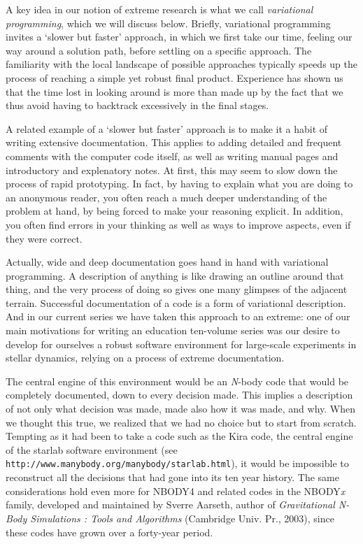 A key idea in our notion of extreme research is what we call {\it
variational programming}, which we will discuss below.  Briefly,
variational programming invites a `slower but faster' approach, in
which we first take our time, feeling our way around a solution path,
before settling on a specific approach.  The familiarity with the
local landscape of possible approaches typically speeds up the process
of reaching a simple yet robust final product.  Experience has shown
us that the time lost in looking around is more than made up by the
fact that we thus avoid having to backtrack excessively in the final
stages.

A related example of a `slower but faster' approach is to make it a
habit of writing extensive documentation.  This applies to adding
detailed and frequent comments with the computer code itself, as well
as writing manual pages and introductory and explenatory notes.  At
first, this may seem to slow down the process of rapid prototyping.
In fact, by having to explain what you are doing to an anonymous
reader, you often reach a much deeper understanding of the problem at
hand, by being forced to make your reasoning explicit.  In addition,
you often find errors in your thinking as well as ways to improve
aspects, even if they were correct.

Actually, wide and deep documentation goes hand in hand with variational
programming.  A description of anything is like drawing an outline around
that thing, and the very process of doing so gives one many glimpses
of the adjacent terrain.  Successful documentation of a code is a form
of variational description.  And in our current series we have taken
this approach to an extreme: one of our main motivations for writing
an education ten-volume series was our desire to develop for ourselves
a robust software environment for large-scale experiments in stellar
dynamics, relying on a process of extreme documentation.

The central engine of this environment would be an {\it N}-body code
that would be completely documented, down to every decision made.
This implies a description of not only what decision was made, made
also how it was made, and why.  When we thought this true, we realized
that we had no choice but to start from scratch.  Tempting as it had
been to take a code such as the Kira code, the central engine of the
starlab software environment (see {\tt
http://www.manybody.org/manybody/starlab.html}), it would be
impossible to reconstruct all the decisions that had gone into its ten
year history.  The same considerations hold even more for NBODY4 and
related codes in the NBODY{\it x} family, developed and maintained by
Sverre Aarseth, author of {\it Gravitational N-Body Simulations :
Tools and Algorithms} (Cambridge Univ. Pr., 2003), since these codes
have grown over a forty-year period.

